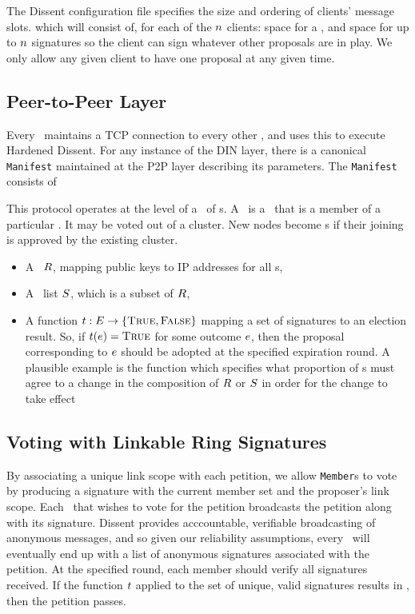 The Dissent configuration file specifies the size and ordering of clients'
message slots. which will
consist of, for each of the $n$ clients: space for a \StructBallot, and space
for up to $n$ signatures so the client can sign whatever other proposals are in
play.  We only allow any given client to have one proposal at any given time.

\subsection{Peer-to-Peer Layer}
Every \KwMember~maintains a TCP connection to every other \KwMember,
and uses this to execute Hardened Dissent.
For any instance of the DIN layer, there is a canonical \texttt{Manifest}
maintained at the P2P layer describing its parameters. The \texttt{Manifest}
consists of

  This protocol operates at the level of a \KwCluster~of
    \KwNode s.  A \KwPeer~is a \KwNode~that is a member of a
    particular \KwCluster. It may be voted out of a cluster. New nodes
    become \KwPeer s if their joining is approved by the existing cluster.

\begin{itemize}
  \item A \KwRoster~$R$, mapping public keys to IP addresses for all
    \KwClient s,
  \item A \KwServer~list $S$, which is a subset of $R$,
  \item A function $t : E \to \{\textsc{True}, \textsc{False}\}$
    mapping a set of signatures to an election result. So, if
    $t(e) = \textsc{True}$ for some outcome $e$,
    then the proposal corresponding to $e$ should be adopted at the
    specified expiration round. A plausible example is the function which
    specifies what proportion of \KwMember s must agree to a change in the
    composition of $R$ or $S$ in order for the change to take
    effect
\end{itemize}

\subsection{Voting with Linkable Ring Signatures}
By associating a unique link scope with each petition, we allow \texttt{Member}s
to vote by producing a signature with the current member set and the proposer's
link scope. Each \KwMember~that wishes to vote for the petition broadcasts
the petition along with its signature. Dissent provides acccountable, verifiable
broadcasting of anonymous messages, and so given our reliability assumptions,
every \KwMember~will eventually end up with a list of anonymous signatures
associated with the petition. At the specified round, each member should verify
all signatures received. If the function $t$ applied to the set of unique, valid
signatures results in \AtomTrue, then the petition passes.

